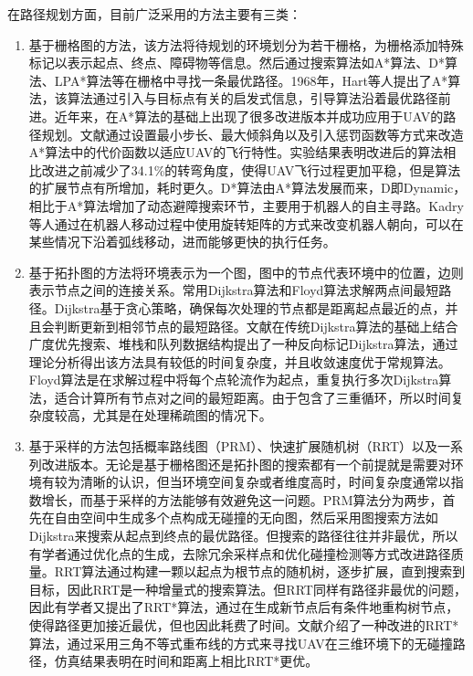 在路径规划方面，目前广泛采用的方法主要有三类：
\begin{enumerate}[topsep = 0 pt, itemsep= 0 pt, parsep=0pt, partopsep=0pt, leftmargin=44pt, itemindent=0pt, labelsep=6pt, label=(\arabic*)]
	\item 基于栅格图的方法，该方法将待规划的环境划分为若干栅格，为栅格添加特殊标记以表示起点、终点、障碍物等信息。然后通过搜索算法如A*算法、D*算法、LPA*算法等在栅格中寻找一条最优路径。1968年，Hart等人提出了A*算法\cite{hartFormalBasisHeuristic1968}，该算法通过引入与目标点有关的启发式信息，引导算法沿着最优路径前进。近年来，在A*算法的基础上出现了很多改进版本并成功应用于UAV的路径规划。文献\cite{liImprovedASTARAlgorithm2024}通过设置最小步长、最大倾斜角以及引入惩罚函数等方式来改造A*算法中的代价函数以适应UAV的飞行特性。实验结果表明改进后的算法相比改进之前减少了34.1\%的转弯角度，使得UAV飞行过程更加平稳，但是算法的扩展节点有所增加，耗时更久。D*算法由A*算法发展而来，D即Dynamic，相比于A*算法增加了动态避障搜索环节，主要用于机器人的自主寻路。Kadry等人通过在机器人移动过程中使用旋转矩阵的方式来改变机器人朝向，可以在某些情况下沿着弧线移动，进而能够更快的执行任务\cite{kadryPathOptimizationDstar2022}。
	\item 基于拓扑图的方法将环境表示为一个图，图中的节点代表环境中的位置，边则表示节点之间的连接关系。常用Dijkstra\cite{dijkstraNoteTwoProblems2022}算法和Floyd算法\cite{floyd1962algorithm}求解两点间最短路径。Dijkstra基于贪心策略，确保每次处理的节点都是距离起点最近的点，并且会判断更新到相邻节点的最短路径。文献\cite{zhuNewAlgorithmBased2021}在传统Dijkstra算法的基础上结合广度优先搜索、堆栈和队列数据结构提出了一种反向标记Dijkstra算法，通过理论分析得出该方法具有较低的时间复杂度，并且收敛速度优于常规算法。Floyd算法是在求解过程中将每个点轮流作为起点，重复执行多次Dijkstra算法，适合计算所有节点对之间的最短距离。由于包含了三重循环，所以时间复杂度较高，尤其是在处理稀疏图的情况下。
	\item 基于采样的方法包括概率路线图（PRM）\cite{geraertsComparativeStudyProbabilistic2004}、快速扩展随机树（RRT）\cite{lavalleRandomizedKinodynamicPlanning2001}以及一系列改进版本。无论是基于栅格图还是拓扑图的搜索都有一个前提就是需要对环境有较为清晰的认识，但当环境空间复杂或者维度高时，时间复杂度通常以指数增长，而基于采样的方法能够有效避免这一问题。PRM算法分为两步，首先在自由空间中生成多个点构成无碰撞的无向图，然后采用图搜索方法如Dijkstra来搜索从起点到终点的最优路径。但搜索的路径往往并非最优，所以有学者通过优化点的生成，去除冗余采样点和优化碰撞检测等方式改进路径质量\cite{liSmartVehiclePath2022}。RRT算法通过构建一颗以起点为根节点的随机树，逐步扩展，直到搜索到目标，因此RRT是一种增量式的搜索算法。但RRT同样有路径非最优的问题，因此有学者又提出了RRT*算法，通过在生成新节点后有条件地重构树节点，使得路径更加接近最优，但也因此耗费了时间。文献\parencite{fusicImprovedRRTAlgorithmBased2024}介绍了一种改进的RRT*算法，通过采用三角不等式重布线的方式来寻找UAV在三维环境下的无碰撞路径，仿真结果表明在时间和距离上相比RRT*更优。
\end{enumerate}

